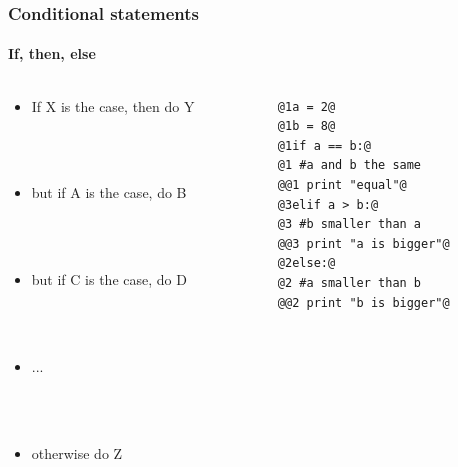 \documentclass{beamer}
\begin{document}
\begin{frame}[fragile]
\frametitle{Conditional statements}
\framesubtitle{If, then, else}
\large
  \begin{columns}[T]
    \begin{column}{.5\textwidth} 


\begin{itemize}


\item<1-> {If X is the case, then do Y}

\ \\

\ \\

\item<3-> but if A is the case, do B

\ \\
\ \\


\item<3-> but if C is the case, do D

\ \\
\ \\


\item<3-> ...

\ \\

\ \\

\item<2-> otherwise do Z




\end{itemize}
     \end{column}     
         \begin{column}{.5\textwidth} 
\begin{lstlisting}[style=base]
@1a = 2@
@1b = 8@
@1if a == b:@
@1 #a and b the same
@@1 print "equal"@
@3elif a > b:@
@3 #b smaller than a
@@3 print "a is bigger"@
@2else:@
@2 #a smaller than b
@@2 print "b is bigger"@
\end{lstlisting}

    \end{column}
    \end{columns}

\end{frame}
\end{document}
